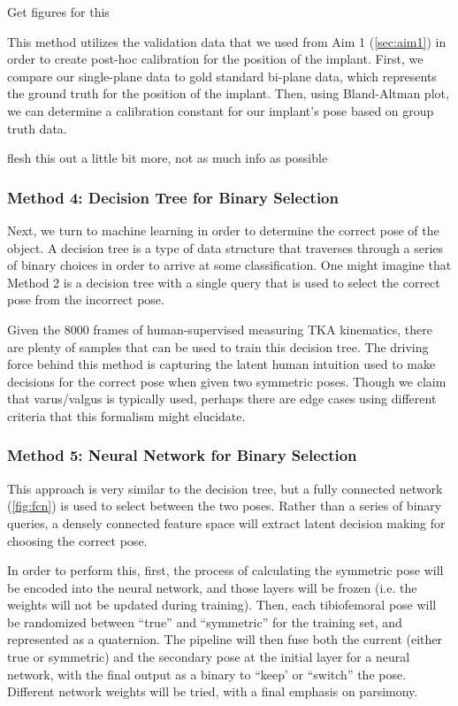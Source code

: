 \begin{center}
    \Large{Get figures for this}
\end{center}

This method utilizes the validation data that we used from Aim 1 (\cref{sec:aim1}) in order to create post-hoc calibration for the position of the implant. First, we compare our single-plane data to gold standard bi-plane data, which represents the ground truth for the position of the implant. Then, using Bland-Altman plot, we can determine a calibration constant for our implant's pose based on group truth data.

\begin{center}
    \Large{flesh this out a little bit more, not as much info as possible}
\end{center}

\subsubsection{Method 4: Decision Tree for Binary Selection}

Next, we turn to machine learning in order to determine the correct pose of the object. A decision tree is a type of data structure that traverses through a series of binary choices in order to arrive at some classification. One might imagine that Method 2 is a decision tree with a single query that is used to select the correct pose from the incorrect pose. 

Given the 8000 frames of human-supervised measuring TKA kinematics, there are plenty of samples that can be used to train this decision tree. The driving force behind this method is capturing the latent human intuition used to make decisions for the correct pose when given two symmetric poses. Though we claim that varus/valgus is typically used, perhaps there are edge cases using different criteria that this formalism might elucidate.

\subsubsection{Method 5: Neural Network for Binary Selection}
This approach is very similar to the decision tree, but a fully connected network (\cref{fig:fcn}) is used to select between the two poses. Rather than a series of binary queries, a densely connected feature space will extract latent decision making for choosing the correct pose.

In order to perform this, first, the process of calculating the symmetric pose will be encoded into the neural network, and those layers will be frozen (i.e. the weights will not be updated during training). Then, each tibiofemoral pose will be randomized between ``true'' and ``symmetric'' for the training set, and represented as a quaternion. The pipeline will then fuse both the current (either true or symmetric) and the secondary pose at the initial layer for a neural network, with the final output as a binary to ``keep' or ``switch'' the pose. Different network weights will be tried, with a final emphasis on parsimony.
